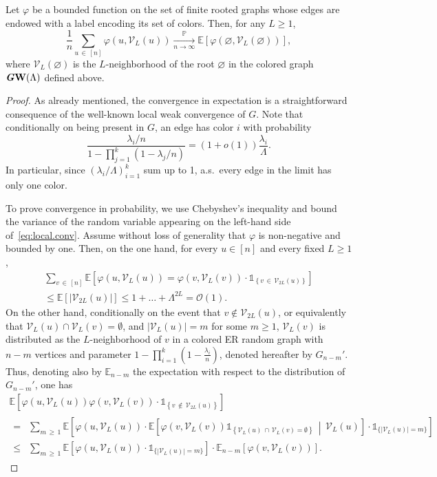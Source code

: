 \documentclass[10pt]{amsart}
\theoremstyle{definition}\newtheorem{defi}[theo]{Definition}\newtheorem{rema}[theo]{Remark}\newtheorem{exam}[theo]{Example}\newtheorem{exem}[theo]{Example}\newtheorem{nota}[theo]{Notation}
\def\mathbi#1{\textbf{\textit #1}}
\renewcommand{\Pr}{\mathbb{P}}
\newcommand{\bbE}{\mathbb{E}}
\newcommand{\cV}{\mathcal{V}}
\newcommand{\cO}{\mathcal{O}}
\begin{document}
\begin{prop}\label{prop:loc.conv}
Let $\varphi$ be a bounded function on the set of finite rooted graphs whose edges are endowed with a label encoding its set of colors. Then, for any $L\ge 1$,
\begin{equation}\label{eq:local.conv}
\frac 1n \sum_{u\,\in\,[n]} \varphi(u,\cV_L(u)) \xrightarrow[n\to \infty]{\Pr} \bbE[\varphi(\varnothing,\cV_L(\varnothing))],
\end{equation}
where $\cV_L(\varnothing)$ is the $L$-neighborhood of the root $\varnothing$ in the colored graph $\mathbi{GW}(\Lambda)$ defined above.
\end{prop}
\begin{proof}
As already mentioned, the convergence in expectation is a straightforward consequence of the well-known local weak convergence of $G$. Note that conditionally on being present in $G$, an edge has color $i$ with probability
\[
\frac{\lambda_i/n}{1-\prod_{j=1}^k\left(1-\lambda_j/n\right)}= (1+o(1))\frac{\lambda_i}{\Lambda}.
\]
In particular, since $(\lambda_i/\Lambda)_{i=1}^k$ sum up to 1, a.s.\ every edge in the limit has only one color.


To prove convergence in probability, we use Chebyshev's inequality and bound the variance of the random variable appearing on the left-hand side of~\eqref{eq:local.conv}. Assume without loss of generality that $\varphi$ is non-negative and bounded by one. Then, on the one hand, for every $u \in [n]$ and every fixed $L\ge 1$,
\begin{multline}\label{eq:cov.1}
\sum_{v\,\in\,[n]} \bbE\left[\varphi(u,\cV_L(u))= \varphi(v,\cV_L(v))\cdot
\mathds{1}_{\left\{v\,\in\,\cV_{2L}(u)\right\}}\right]\\
\le \bbE[|\cV_{2L}(u)|] 
\le 1+\dots+\Lambda^{2L}=\cO(1).
\end{multline}
On the other hand, conditionally on the event that $v\notin \cV_{2L}(u)$, or equivalently that $\cV_L(u)\cap \cV_L(v)=\emptyset$, and $|\cV_L(u)|=m$ for some $m\ge 1$, $\cV_L(v)$ is distributed as the $L$-neighborhood of $v$ in a colored ER random graph with $n-m$ vertices and parameter $1-\prod_{i=1}^k(1-\tfrac{\lambda_i}{n})$, denoted hereafter by $G_{n-m}'$. Thus, denoting also by $\bbE_{n-m}$ the expectation with respect to the distribution of $G_{n-m}'$, one has
\begin{multline*}
 \bbE\left[\varphi(u,\cV_L(u)) \varphi(v,\cV_L(v))\cdot
\mathds{1}_{\left\{ v\,\notin\,\cV_{2L}(u)\right\}}\right] \\
\begin{aligned}
= & \sum_{m\,\ge\,1} \bbE\left[\varphi(u,\cV_L(u)) \cdot \bbE\left[\varphi(v,\cV_L(v))\mathds 1_{\left\{\cV_L(u)\,\cap\,\cV_L(v)=\emptyset\right\}} \,\middle|\, \cV_L(u)\right]\cdot \mathds 1_{\{|\cV_L(u)|=m\}} \right] \\
\le & \sum_{m\,\ge\,1} \bbE\left[\varphi(u,\cV_L(u)) \cdot \mathds 1_{\{|\cV_L(u)|=m\}} \right]\cdot \bbE_{n-m}\left[\varphi(v,\cV_L(v))\right].
\end{aligned}
\end{multline*}


\end{proof}
\end{document}
